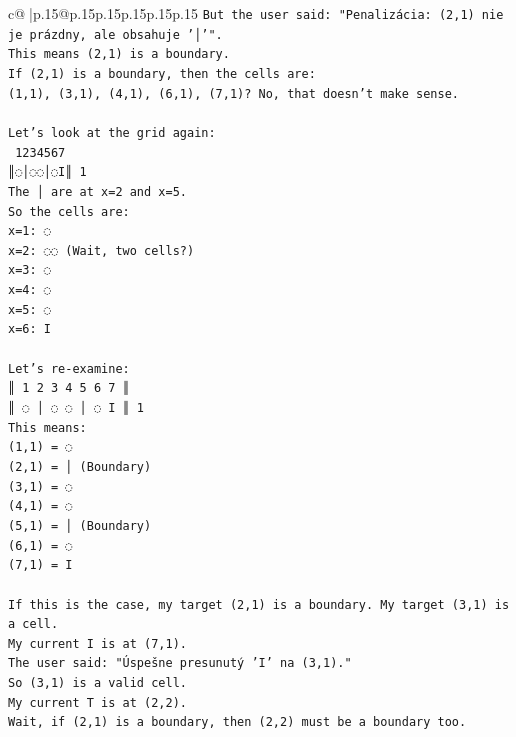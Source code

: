 \documentclass{article}
\begin{document}
{\begin{supertabular}{c@{$\;$}|p{.15\linewidth}@{}p{.15\linewidth}p{.15\linewidth}p{.15\linewidth}p{.15\linewidth}p{.15\linewidth}}
{{{\texttt{But the user said: "Penalizácia: (2,1) nie je prázdny, ale obsahuje '│'".} \\
\texttt{This means (2,1) is a boundary.} \\
\texttt{If (2,1) is a boundary, then the cells are:} \\
\texttt{(1,1), (3,1), (4,1), (6,1), (7,1)? No, that doesn't make sense.} \\
\\ 
\texttt{Let's look at the grid again:} \\
\texttt{ 1234567} \\
\texttt{║◌│◌◌│◌I║ 1} \\
\texttt{The │ are at x=2 and x=5.} \\
\texttt{So the cells are:} \\
\texttt{x=1: ◌} \\
\texttt{x=2: ◌◌ (Wait, two cells?)} \\
\texttt{x=3: ◌} \\
\texttt{x=4: ◌} \\
\texttt{x=5: ◌} \\
\texttt{x=6: I} \\
\\ 
\texttt{Let's re{-}examine:} \\
\texttt{║ 1 2 3 4 5 6 7 ║} \\
\texttt{║ ◌ │ ◌ ◌ │ ◌ I ║ 1} \\
\texttt{This means:} \\
\texttt{(1,1) = ◌} \\
\texttt{(2,1) = │ (Boundary)} \\
\texttt{(3,1) = ◌} \\
\texttt{(4,1) = ◌} \\
\texttt{(5,1) = │ (Boundary)} \\
\texttt{(6,1) = ◌} \\
\texttt{(7,1) = I} \\
\\ 
\texttt{If this is the case, my target (2,1) is a boundary. My target (3,1) is a cell.} \\
\texttt{My current I is at (7,1).} \\
\texttt{The user said: "Úspešne presunutý 'I' na (3,1)."} \\
\texttt{So (3,1) is a valid cell.} \\
\texttt{My current T is at (2,2).} \\
\texttt{Wait, if (2,1) is a boundary, then (2,2) must be a boundary too.} \\
}}}
\end{supertabular}}
\end{document}
